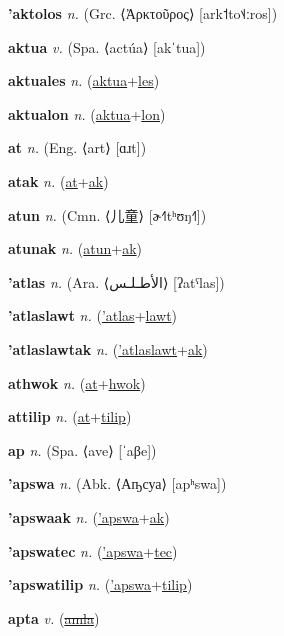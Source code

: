 \textbf{\hypertarget{'aktolos}{'aktolos}} \textit{n.} (Grc. ⟨Ἀρκτοῦρος⟩ [ark˦to˦˨ːros])


\textbf{\hypertarget{aktua}{aktua}} \textit{v.} (Spa. ⟨actúa⟩ [akˈtua])


\textbf{\hypertarget{aktuales}{aktuales}} \textit{n.} (\hyperlink{aktua}{aktua}+\allowbreak \hyperlink{les}{les})


\textbf{\hypertarget{aktualon}{aktualon}} \textit{n.} (\hyperlink{aktua}{aktua}+\allowbreak \hyperlink{lon}{lon})


\textbf{\hypertarget{at}{at}} \textit{n.} (Eng. ⟨art⟩ [ɑɹt])


\textbf{\hypertarget{atak}{atak}} \textit{n.} (\hyperlink{at}{at}+\allowbreak \hyperlink{ak}{ak})


\textbf{\hypertarget{atun}{atun}} \textit{n.} (Cmn. ⟨{\chinese{}儿童}⟩ [ɚ˧˥tʰʊŋ˧˥])


\textbf{\hypertarget{atunak}{atunak}} \textit{n.} (\hyperlink{atun}{atun}+\allowbreak \hyperlink{ak}{ak})


\textbf{\hypertarget{'atlas}{'atlas}} \textit{n.} (Ara. ⟨{\arabics{}الأطـلـس‎}⟩ [ʔatˤlas])


\textbf{\hypertarget{'atlaslawt}{'atlaslawt}} \textit{n.} (\hyperlink{'atlas}{'atlas}+\allowbreak \hyperlink{lawt}{lawt})


\textbf{\hypertarget{'atlaslawtak}{'atlaslawtak}} \textit{n.} (\hyperlink{'atlaslawt}{'atlaslawt}+\allowbreak \hyperlink{ak}{ak})


\textbf{\hypertarget{athwok}{athwok}} \textit{n.} (\hyperlink{at}{at}+\allowbreak \hyperlink{hwok}{hwok})


\textbf{\hypertarget{attilip}{attilip}} \textit{n.} (\hyperlink{at}{at}+\allowbreak \hyperlink{tilip}{tilip})


\textbf{\hypertarget{ap}{ap}} \textit{n.} (Spa. ⟨ave⟩ [ˈaβe])


\textbf{\hypertarget{'apswa}{'apswa}} \textit{n.} (Abk. ⟨Аҧсуа⟩ [apʰswa])


\textbf{\hypertarget{'apswaak}{'apswaak}} \textit{n.} (\hyperlink{'apswa}{'apswa}+\allowbreak \hyperlink{ak}{ak})


\textbf{\hypertarget{'apswatec}{'apswatec}} \textit{n.} (\hyperlink{'apswa}{'apswa}+\allowbreak \hyperlink{tec}{tec})


\textbf{\hypertarget{'apswatilip}{'apswatilip}} \textit{n.} (\hyperlink{'apswa}{'apswa}+\allowbreak \hyperlink{tilip}{tilip})


\textbf{\hypertarget{apta}{apta}} \textit{v.} (\hyperlink{amla}{\sout{amla}})


